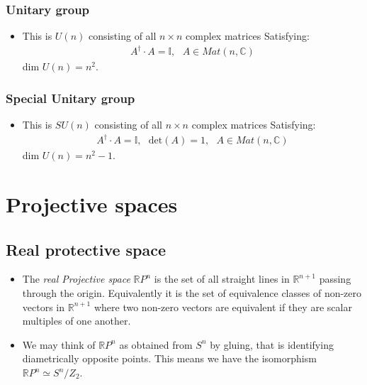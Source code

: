 \documentclass[11pt]{article}
\numberwithin{equation}{section}
\DeclareRobustCommand{\RR}{\mathbb{R}}
\begin{document}
\subsubsection{Unitary group}
    \begin{itemize}
      \item This is $U(n)$ consisting of all $n \times n$ complex matrices Satisfying:  
      \begin{align*}
A^{\dagger} \cdot A = \mathbb{I},~~~A \in Mat(n,\mathbb{C})
\end{align*}
dim $U(n) =n^2$.
\end{itemize}

\subsubsection{Special Unitary group}
    \begin{itemize}
      \item This is $SU(n)$ consisting of all $n \times n$ complex matrices Satisfying:  
      \begin{align*}
A^{\dagger} \cdot A = \mathbb{I},~~~\text{det}(A)=1,~~~A \in Mat(n,\mathbb{C})
\end{align*}
dim $U(n) =n^2-1$.
\end{itemize}

\newpage
\section{Projective spaces}
\subsection{Real protective space}
\begin{itemize}
  \item The \emph{real Projective space} $\RR P^{n}$ is the set of all straight lines in $\RR^{n+1}$ passing through the origin. Equivalently it is the set of equivalence classes of non-zero vectors in $\RR^{n+1}$ where two non-zero vectors are equivalent if they are scalar multiples of one another. 

   \item We may think of $\RR P^n$ as obtained from $S^{n}$ by gluing, that is identifying diametrically opposite points. This means we have the isomorphism $\RR P^n \simeq S^{n}/Z_2$.   
\end{itemize}
\end{document}

